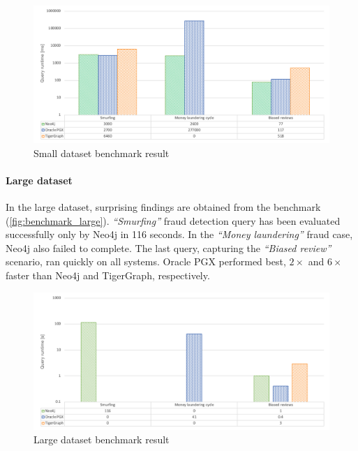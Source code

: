 \begin{figure}[!ht]
  \centering
  \includegraphics[width=\textwidth]{figures/static_benchmark_plot_small.png}
  \caption{Small dataset benchmark result} 
  \label{fig:benchmark_small}
\end{figure}

\paragraph{Large dataset}
In the large dataset, surprising findings are obtained from the benchmark (\autoref{fig:benchmark_large}).
\textit{``Smurfing''} fraud detection query has been evaluated successfully only by Neo4j in 116 seconds.
In the \textit{``Money laundering''} fraud case, Neo4j also failed to complete.
The last query, capturing the \textit{``Biased review''} scenario, ran quickly on all systems.
Oracle PGX performed best, $2\times$ and $6\times$ faster than Neo4j and TigerGraph, respectively.

\begin{figure}[!ht]
  \centering
  \includegraphics[width=\textwidth]{figures/static_benchmark_plot_large.png}
  \caption{Large dataset benchmark result} 
  \label{fig:benchmark_large}
\end{figure}
